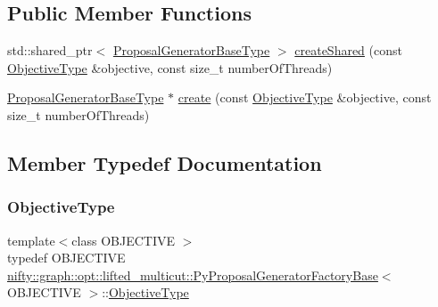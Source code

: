 \subsection*{Public Member Functions}
\begin{DoxyCompactItemize}
\item 
std\+::shared\+\_\+ptr$<$ \hyperlink{classnifty_1_1graph_1_1opt_1_1lifted__multicut_1_1ProposalGeneratorFactoryBase_ab201fe6397370621b50977e67ae55ace}{Proposal\+Generator\+Base\+Type} $>$ \hyperlink{classnifty_1_1graph_1_1opt_1_1lifted__multicut_1_1PyProposalGeneratorFactoryBase_a1a74cc625dc38c80bf2bf64593a13346}{create\+Shared} (const \hyperlink{classnifty_1_1graph_1_1opt_1_1lifted__multicut_1_1ProposalGeneratorFactoryBase_a1986f0a3868e76ba5613f49ca4fc7dc6}{Objective\+Type} \&objective, const size\+\_\+t number\+Of\+Threads)
\item 
\hyperlink{classnifty_1_1graph_1_1opt_1_1lifted__multicut_1_1ProposalGeneratorFactoryBase_ab201fe6397370621b50977e67ae55ace}{Proposal\+Generator\+Base\+Type} $\ast$ \hyperlink{classnifty_1_1graph_1_1opt_1_1lifted__multicut_1_1PyProposalGeneratorFactoryBase_aa3041cdd0edf7e91144644a302f991bb}{create} (const \hyperlink{classnifty_1_1graph_1_1opt_1_1lifted__multicut_1_1ProposalGeneratorFactoryBase_a1986f0a3868e76ba5613f49ca4fc7dc6}{Objective\+Type} \&objective, const size\+\_\+t number\+Of\+Threads)
\end{DoxyCompactItemize}


\subsection{Member Typedef Documentation}
\mbox{\label{classnifty_1_1graph_1_1opt_1_1lifted__multicut_1_1PyProposalGeneratorFactoryBase_ae6a34208c3b9e4821ab10103a4e35202}} 
\subsubsection{\texorpdfstring{Objective\+Type}{ObjectiveType}}
{\footnotesize\ttfamily template$<$class O\+B\+J\+E\+C\+T\+I\+VE $>$ \\
typedef O\+B\+J\+E\+C\+T\+I\+VE \hyperlink{classnifty_1_1graph_1_1opt_1_1lifted__multicut_1_1PyProposalGeneratorFactoryBase}{nifty\+::graph\+::opt\+::lifted\+\_\+multicut\+::\+Py\+Proposal\+Generator\+Factory\+Base}$<$ O\+B\+J\+E\+C\+T\+I\+VE $>$\+::\hyperlink{classnifty_1_1graph_1_1opt_1_1lifted__multicut_1_1ProposalGeneratorFactoryBase_a1986f0a3868e76ba5613f49ca4fc7dc6}{Objective\+Type}}


